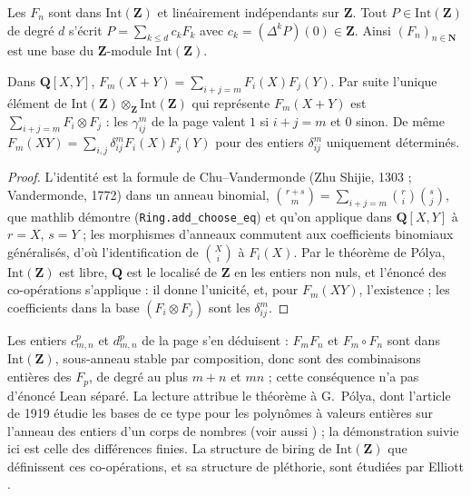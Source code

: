 \begin{enonce}
Les $F_n$ sont dans $\mathrm{Int}(\mathbf Z)$ et linéairement indépendants sur $\mathbf Z$. Tout $P \in \mathrm{Int}(\mathbf Z)$ de degré $d$ s'écrit $P = \sum_{k \le d} c_k F_k$ avec $c_k = (\Delta^k P)(0) \in \mathbf Z$. Ainsi $(F_n)_{n \in \mathbf N}$ est une base du $\mathbf Z$-module $\mathrm{Int}(\mathbf Z)$.
\end{enonce}


\begin{enonce}
Dans $\mathbf Q[X, Y]$, $F_m(X + Y) = \sum_{i + j = m} F_i(X) F_j(Y)$. Par suite l'unique élément de $\mathrm{Int}(\mathbf Z) \otimes_{\mathbf Z} \mathrm{Int}(\mathbf Z)$ qui représente $F_m(X + Y)$ est $\sum_{i+j=m} F_i \otimes F_j$ : les $\gamma^m_{ij}$ de la page valent $1$ si $i + j = m$ et $0$ sinon. De même $F_m(XY) = \sum_{i,j} \delta^m_{ij} F_i(X) F_j(Y)$ pour des entiers $\delta^m_{ij}$ uniquement déterminés.
\end{enonce}

\begin{proof}
L'identité est la formule de Chu--Vandermonde (Zhu Shijie, 1303 ; Vandermonde, 1772) dans un anneau binomial, $\binom{r+s}{m} = \sum_{i+j=m} \binom{r}{i}\binom{s}{j}$, que mathlib démontre (\texttt{Ring.\allowbreak{}add\_choose\_eq}) et qu'on applique dans $\mathbf Q[X, Y]$ à $r = X$, $s = Y$ ; les morphismes d'anneaux commutent aux coefficients binomiaux généralisés, d'où l'identification de $\binom{X}{i}$ à $F_i(X)$. Par le théorème de Pólya, $\mathrm{Int}(\mathbf Z)$ est libre, $\mathbf Q$ est le localisé de $\mathbf Z$ en les entiers non nuls, et l'énoncé des co-opérations s'applique : il donne l'unicité, et, pour $F_m(XY)$, l'existence ; les coefficients dans la base $(F_i \otimes F_j)$ sont les $\delta^m_{ij}$.
\end{proof}

\begin{remarque}
Les entiers $c^p_{m,n}$ et $d^p_{m,n}$ de la page s'en déduisent : $F_m F_n$ et $F_m \circ F_n$ sont dans $\mathrm{Int}(\mathbf Z)$, sous-anneau stable par composition, donc sont des combinaisons entières des $F_p$, de degré au plus $m + n$ et $mn$ ; cette conséquence n'a pas d'énoncé Lean séparé. La lecture attribue le théorème à G.~Pólya, dont l'article de 1919 étudie les bases de ce type pour les polynômes à valeurs entières sur l'anneau des entiers d'un corps de nombres \cite{polya1919} (voir aussi \cite{cahen1997}) ; la démonstration suivie ici est celle des différences finies. La structure de biring de $\mathrm{Int}(\mathbf Z)$ que définissent ces co-opérations, et sa structure de pléthorie, sont étudiées par Elliott \cite{elliott2010}.
\end{remarque}

